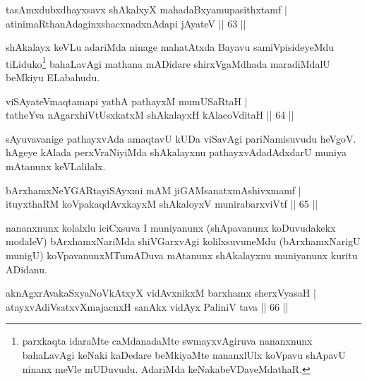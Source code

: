 \begin{shl}
tasAmxdubxdhayxsavx shAkalxyX mahadaBxyamupasithxtamf |\\
atinimaRthanAdaginxshacxnadxnAdapi jAyateV \hfill || 63 ||
\end{shl}

\begin{artha}
shAkalayx keVLu adariMda ninage mahatAtxda Bayavu samiVpisideyeMdu tiLiduko\footnote[1]{parxkaqta idaraMte caMdanadaMte swmayxvAgiruva nananxnunx bahaLavAgi keNaki kaDedare beMkiyaMte nananxlUlx koVpavu shApavU ninanx meVle mUDuvudu. AdariMda keNakabeVDaveMdathaR.} bahaLavAgi mathana mADidare shirxVgaMdhada maradiMdalU beMkiyu ELabahudu.
\end{artha}

\begin{shl}
viSAyateV\s maqtamapi yathA pathayxM mumUSaRtaH |\\
tatheYva nAgarxhiVtUsxkatxM shAkalayxH kAlacoVditaH \hfill || 64 ||
\end{shl}

\begin{artha}%
sAyuvavanige pathayxvAda amaqtavU kUDa viSavAgi pariNamisuvudu heVgoV. hAgeye kAlada perxVraNiyiMda shAkalayxnu pathayxvAdadAdxdarU muniya mAtanunx keVLalilalx.
\end{artha}


\begin{shl}
bArxhamxNeYGARtayiSAyxmi mAM jiGAMsanatxmAshivxmamf |\\
ituyxthaRM koVpakaqdAvxkayxM shAkaloyxV munirabarxviVtf \hfill || 65 ||
\end{shl}

\begin{artha}
nananxnunx kolalxlu iciCxsuva I muniyanunx (shApavanunx koDuvudakekx modaleV) bArxhamxNariMda shiVGarxvAgi kolilxsuvuneMdu (bArxhamxNarigU munigU) koVpavanunxMTumADuva mAtanunx shAkalayxnu muniyanunx kuritu ADidanu.
\end{artha}


\begin{shl}
\footnotetext[1]{}aknAgxrAvakaSxyaNoVkAtxyX vidAvxnikxM barxhamx sherxVyasaH |\\
atayxvAdiVsatxvXmajacnxH sanAkx vidAyx PaliniV tava \hfill || 66 ||
\end{shl}

